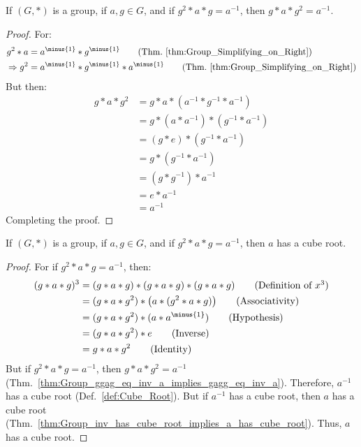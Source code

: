     \begin{theorem}
        \label{thm:Group_ggag_eq_inv_a_implies_gagg_eq_inv_a}%
        If $(G,*)$ is a group, if $a,g\in{G}$, and if $g^{2}*a*g=a^{\minus{1}}$,
        then $g*a*g^{2}=a^{\minus{1}}$.
    \end{theorem}
    \begin{proof}
        For:
        \begin{align}
            g^{2}*a&=a^{\minus{1}}*g^{\minus{1}}
            \tag{Thm.~\ref{thm:Group_Simplifying_on_Right}}\\
            \Rightarrow
            g^{2}&=a^{\minus{1}}*g^{\minus{1}}*a^{\minus{1}}
            \tag{Thm.~\ref{thm:Group_Simplifying_on_Right}}
        \end{align}
        But then:
        \begin{align*}
            g*a*g^{2}&=g*a*(a^{\minus{1}}*g^{\minus{1}}*a^{\minus{1}})\\
            &=g*(a*a^{\minus{1}})*(g^{\minus{1}}*a^{\minus{1}})
            \tag{Associativity}\\
            &=(g*e)*(g^{\minus{1}}*a^{\minus{1}})
            \tag{Inverse}\\
            &=g*(g^{\minus{1}}*a^{\minus{1}})
            \tag{Identity}\\
            &=(g*g^{\minus{1}})*a^{\minus{1}}
            \tag{Associativity}\\
            &=e*a^{\minus{1}}
            \tag{Inverse}\\
            &=a^{\minus{1}}
            \tag{Identity}
        \end{align*}
        Completing the proof.
    \end{proof}
    \begin{theorem}
        If $(G,*)$ is a group, if $a,g\in{G}$, and if $g^{2}*a*g=a^{\minus{1}}$,
        then $a$ has a cube root.
    \end{theorem}
    \begin{proof}
        For if $g^{2}*a*g=a^{\minus{1}}$, then:
        \begin{align}
            (g*a*g)^{3}
            &=(g*a*g)*(g*a*g)*(g*a*g)
            \tag{Definition of $x^{3}$}\\
            &=(g*a*g^{2})*\big(a*(g^{2}*a*g)\big)
            \tag{Associativity}\\
            &=(g*a*g^{2})*(a*a^{\minus{1}})
            \tag{Hypothesis}\\
            &=(g*a*g^{2})*e
            \tag{Inverse}\\
            &=g*a*g^{2}
            \tag{Identity}
        \end{align}
        But if $g^{2}*a*g=a^{\minus{1}}$, then $g*a*g^{2}=a^{\minus{1}}$
        (Thm.~\ref{thm:Group_ggag_eq_inv_a_implies_gagg_eq_inv_a}).
        Therefore, $a^{\minus{1}}$ has a cube root (Def.~\ref{def:Cube_Root}).
        But if $a^{\minus{1}}$ has a cube root, then $a$ has a cube root
        (Thm.~\ref{thm:Group_inv_has_cube_root_implies_a_has_cube_root}). Thus,
        $a$ has a cube root.
    \end{proof}
